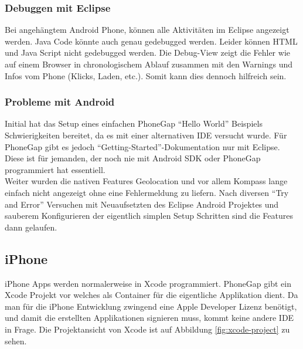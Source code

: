 \subsubsection{Debuggen mit Eclipse} %
\label{ssub:Debuggen mit Eclipse}
Bei angehängtem Android Phone, können alle Aktivitäten im Eclipse angezeigt werden. Java Code könnte auch genau gedebugged werden. Leider können HTML und Java Script nicht gedebugged werden. Die Debug-View zeigt die Fehler wie auf einem Browser in chronologischem Ablauf zusammen mit den Warnings und Infos vom Phone (Klicks, Laden, etc.). Somit kann dies dennoch hilfreich sein. 

\subsubsection{Probleme mit Android} %
\label{ssub:probleme_mit_android}
Initial hat das Setup eines einfachen PhoneGap "`Hello World"' Beispiels Schwierigkeiten bereitet, da es mit einer alternativen IDE versucht wurde. Für PhoneGap gibt es jedoch "`Getting-Started"'-Dokumentation nur mit Eclipse. Diese ist für jemanden, der noch nie mit Android SDK oder PhoneGap programmiert hat essentiell. \\
Weiter wurden die nativen Features Geolocation und vor allem Kompass lange einfach nicht angezeigt ohne eine Fehlermeldung zu liefern. Nach diversen "`Try and Error"' Versuchen mit Neuaufsetzten des Eclipse Android Projektes und sauberem Konfigurieren der eigentlich simplen Setup Schritten sind die Features dann gelaufen. 


\subsection{iPhone} %
\label{sub:iPhone}
iPhone Apps werden normalerweise in Xcode programmiert. PhoneGap gibt ein Xcode Projekt vor welches als Container für die eigentliche Applikation dient. Da man für die iPhone Entwicklung zwingend eine Apple Developer Lizenz benötigt, und damit die erstellten Applikationen signieren muss, kommt keine andere IDE in Frage. Die Projektansicht von Xcode ist auf Abbildung \ref{fig:xcode-project} zu sehen.

